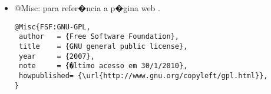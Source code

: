 \begin{itemize}
\item @Misc: para refer�ncia a p�gina web \citep{FSF:GNU-GPL}.
{\scriptsize\begin{verbatim}
@Misc{FSF:GNU-GPL,
 author   = {Free Software Foundation},
 title    = {GNU general public license},
 year     = {2007},
 note     = {�ltimo acesso em 30/1/2010},
 howpublished= {\url{http://www.gnu.org/copyleft/gpl.html}},
}
\end{verbatim}}

\end{itemize}

